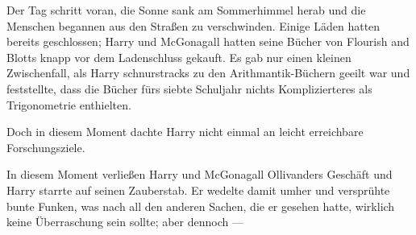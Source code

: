 Der Tag schritt voran, die Sonne sank am Sommerhimmel herab und die Menschen begannen aus den Straßen zu verschwinden. Einige Läden hatten bereits geschlossen; Harry und McGonagall hatten seine Bücher von Flourish and Blotts knapp vor dem Ladenschluss gekauft. Es gab nur einen kleinen Zwischenfall, als Harry schnurstracks zu den Arithmantik-Büchern geeilt war und feststellte, dass die Bücher fürs siebte Schuljahr nichts Komplizierteres als Trigonometrie enthielten.

Doch in diesem Moment dachte Harry nicht einmal an leicht erreichbare Forschungsziele.

In diesem Moment verließen Harry und McGonagall Ollivanders Geschäft und Harry starrte auf seinen Zauberstab. Er wedelte damit umher und versprühte bunte Funken, was nach all den anderen Sachen, die er gesehen hatte, wirklich keine Überraschung sein sollte; aber dennoch —

